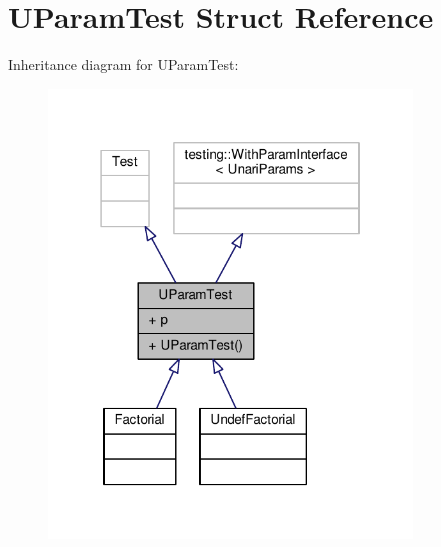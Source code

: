 \hypertarget{struct_u_param_test}{}\section{U\+Param\+Test Struct Reference}
\label{struct_u_param_test}


Inheritance diagram for U\+Param\+Test\+:
\nopagebreak
\begin{figure}[H]
\begin{center}
\leavevmode
\includegraphics[width=274pt]{struct_u_param_test__inherit__graph}
\end{center}
\end{figure}


